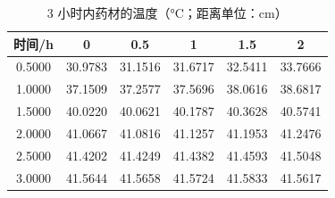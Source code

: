 \begin{table}[htbp]
  \centering
  \caption{3 小时内药材的温度（°C；距离单位：cm）}
  \label{tab:q2-temperature}
  \begin{tabular}{cccccc}
    \toprule
    时间/h & 0 & 0.5 & 1 & 1.5 & 2 \\
    \midrule
    0.5000 & 30.9783 & 31.1516 & 31.6717 & 32.5411 & 33.7666 \\
    1.0000 & 37.1509 & 37.2577 & 37.5696 & 38.0616 & 38.6817 \\
    1.5000 & 40.0220 & 40.0621 & 40.1787 & 40.3628 & 40.5741 \\
    2.0000 & 41.0667 & 41.0816 & 41.1257 & 41.1953 & 41.2476 \\
    2.5000 & 41.4202 & 41.4249 & 41.4382 & 41.4593 & 41.5048 \\
    3.0000 & 41.5644 & 41.5658 & 41.5724 & 41.5833 & 41.5617 \\
    \bottomrule
  \end{tabular}
\end{table}
